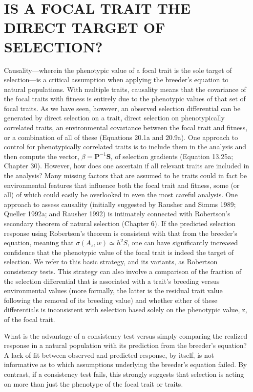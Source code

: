 \documentclass{article}
\begin{document}
\section{IS A FOCAL TRAIT THE DIRECT TARGET OF SELECTION?}
Causality—wherein the phenotypic value of a focal trait is the sole target of selection—is a critical assumption when applying the breeder's equation to natural populations. With multiple traits, causality means that the covariance of the focal traits with fitness is entirely due to the phenotypic values of that set of focal traits. As we have seen, however, an observed selection differential can be generated by direct selection on a trait, direct selection on phenotypically correlated traits, an environmental covariance between the focal trait and fitness, or a combination of all of these (Equations 20.1a and 20.9a). One approach to control for phenotypically correlated traits is to include them in the analysis and then compute the vector,  $ \beta = \mathbf{P}^{-1} \mathbf{S} $, of selection gradients (Equation 13.25a; Chapter 30). However, how does one ascertain if all relevant traits are included in the analysis? Many missing factors that are assumed to be traits could in fact be environmental features that influence both the focal trait and fitness, some (or all) of which could easily be overlooked in even the most careful analysis. One approach to assess causality (initially suggested by Rausher and Simms 1989; Queller 1992a; and Rausher 1992) is intimately connected with Robertson's secondary theorem of natural selection (Chapter 6). If the predicted selection response using Robertson's theorem is consistent with that from the breeder's equation, meaning that  $ \sigma(A_z, w) \simeq h^2 S $, one can have significantly increased confidence that the phenotypic value of the focal trait is indeed the target of selection. We refer to this basic strategy, and its variants, as Robertson consistency tests. This strategy can also involve a comparison of the fraction of the selection differential that is associated with a trait's breeding versus environmental values (more formally, the latter is the residual trait value following the removal of its breeding value) and whether either of these differentials is inconsistent with selection based solely on the phenotypic value, z, of the focal trait.

What is the advantage of a consistency test versus simply comparing the realized response in a natural population with its prediction from the breeder's equation? A lack of fit between observed and predicted response, by itself, is not informative as to which assumptions underlying the breeder's equation failed. By contrast, if a consistency test fails, this strongly suggests that selection is acting on more than just the phenotype of the focal trait or traits.
\end{document}

